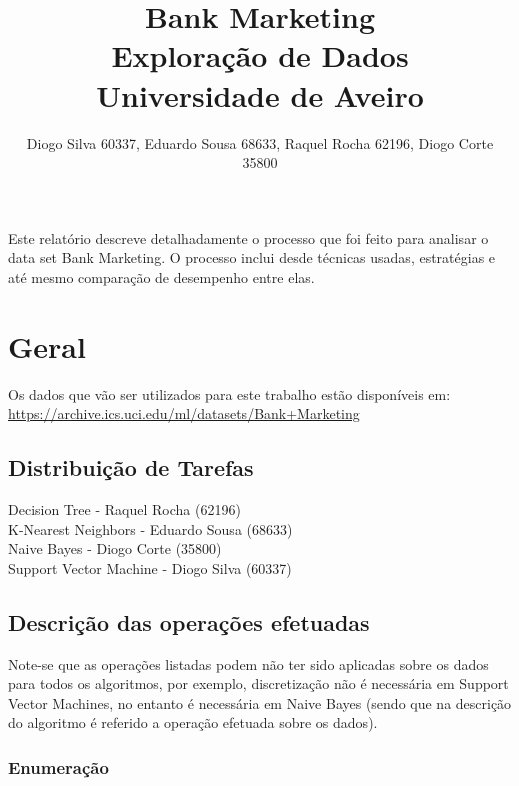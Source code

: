 \documentclass[portugues,final]{revdetua}
\begin{document}

\title{\textbf{Bank Marketing}\\ Exploração de Dados \\Universidade de Aveiro}
\author{Diogo Silva 60337, Eduardo Sousa 68633, Raquel Rocha 62196, Diogo Corte 35800}
\maketitle
\begin{resumo} %
Este relatório descreve detalhadamente o processo que foi feito para analisar o data set Bank Marketing.
O processo inclui desde técnicas usadas, estratégias e até mesmo comparação de desempenho entre elas.
\end{resumo}

\section{Geral}

Os dados que vão ser utilizados para este trabalho estão disponíveis em:
\url{https://archive.ics.uci.edu/ml/datasets/Bank+Marketing}

\subsection{Distribuição de Tarefas}
Decision Tree - Raquel Rocha (62196)\\
K-Nearest Neighbors - Eduardo Sousa (68633)\\
Naive Bayes - Diogo Corte (35800)\\
Support Vector Machine - Diogo Silva (60337)

\subsection{Descrição das operações efetuadas}

Note-se que as operações listadas podem não ter sido aplicadas sobre os dados para todos os algoritmos, por exemplo, discretização não é necessária em Support Vector Machines, no entanto é necessária em Naive Bayes (sendo que na descrição do algoritmo é referido a operação efetuada sobre os dados).

\subsubsection{Enumeração}
\end{document}
